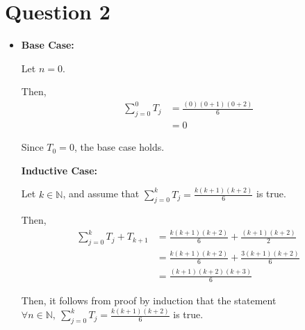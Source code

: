 \documentclass[12pt]{article}
\begin{document}
\section*{Question 2}
\begin{itemize}
    \item

    \textbf{Base Case:}

    Let $n = 0$.

    \bigskip

    Then,
    \setcounter{equation}{0}
    \begin{align}
        \sum\limits_{j=0}^0 T_j &= \frac{(0)(0 + 1)(0 + 2)}{6}\\
        &= 0
    \end{align}

    \bigskip

    Since $T_0 = 0$, the base case holds.

    \bigskip

    \textbf{Inductive Case:}

    \bigskip

    Let $k \in \mathbb{N}$, and assume that $\sum\limits_{j=0}^k T_j =
    \frac{k(k+1)(k+2)}{6}$ is true.

    \bigskip

    Then,
    \setcounter{equation}{0}
    \begin{align}
        \sum\limits_{j=0}^k T_j + T_{k+1} &= \frac{k(k+1)(k+2)}{6} + \frac{(k+1)(k+2)}{2}\\
        &= \frac{k(k+1)(k+2)}{6} + \frac{3(k+1)(k+2)}{6}\\
        &= \frac{(k+1)(k+2)(k+3)}{6}
    \end{align}

    \bigskip

    Then, it follows from proof by induction that the statement $\forall n \in
    \mathbb{N},\:\sum\limits_{j=0}^k T_j = \frac{k(k+1)(k+2)}{6}$ is true.

\end{itemize}
\end{document}
